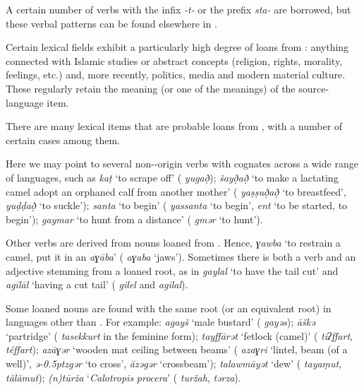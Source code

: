 \documentclass[output=paper]{langsci/langscibook}
\begin{document}
A certain number of   verbs with the infix \textit{{}-}\textit{t-} or the prefix \textit{sta-} are borrowed, but these verbal patterns can be found elsewhere in . 

Certain lexical fields exhibit a particularly high degree of loans from  : anything connected with Islamic studies or abstract concepts (religion, rights, morality, feelings, etc.) and, more recently, politics, media and modern material culture. These regularly retain the meaning (or one of the meanings) of the {source-language} item. 


There are many lexical items that are probable loans from , with a number of certain cases among them. 

Here we may point to several non--origin verbs with cognates across a wide range of  languages, such as \textit{k{\R}aṭ} ‘to scrape off’ ( \textit{yug{\R}að̣}); \textit{šayð̣að̣} ‘to make a lactating camel adopt an orphaned calf from another mother’ ( \textit{yaṣṣuð̣að̣} ‘to breastfeed’, \textit{yuḍḍað̣} ‘to suckle’); \textit{santa} ‘to begin’ ( \textit{yassanta} ‘to begin’,  \textit{ent} ‘to be started, to begin’); \textit{gaymar} ‘to hunt from a distance’ ( \textit{gmər} ‘to hunt'). 

Other verbs are derived from nouns loaned from . Hence, \textit{ɣawba} ‘to restrain a camel, put it in an \textit{aɣāba}’ ( \textit{aɣaba} ‘jaws’). Sometimes there is both a verb and an adjective stemming from a loaned {root}, as in \textit{gaylal} ‘to have the tail cut’ and \textit{agīlāl} ‘having a cut tail’ ( \textit{gilel} and \textit{agilal}). 

Some loaned  nouns are found with the same {root} (or an equivalent {root}) in  languages other than . For example: \textit{agayš} ‘male bustard’ ( \textit{gayəs}); \textit{āškə{\R}} ‘partridge’ ( \textit{tasekkurt} in the feminine form); \textit{tayffārət} ‘fetlock (camel)’ ( \textit{tiʔffart},  \textit{téffart}); \textit{azāɣər} ‘wooden mat ceiling between beams’ ( \textit{azaɣri} ‘lintel, beam (of a well)’,  \textit{ǝ\kern -0.5ptzgər} ‘to cross’, \textit{ăzəgər} ‘crossbeam’); \textit{talawmāyət} ‘dew’ ( \textit{tayaṃut},  \textit{tălămut}); \textit{(n)tūrža} ‘\textit{Calotropis} \textit{procera}’ ( \textit{turžah},  \textit{tərza}).
\end{document}
